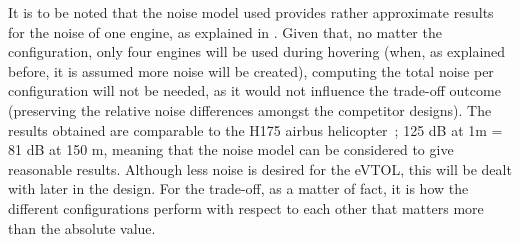 It is to be noted that the noise model used provides rather approximate results for the noise of one engine, as explained in .
Given that, no matter the configuration, only four engines will be used during hovering (when, as explained before, it is assumed more noise will be created), computing the total noise per configuration will not be needed, as it would not influence the trade-off outcome (preserving the relative noise differences amongst the competitor designs).
The results obtained are comparable to the H175 airbus helicopter~\cite{HeliAirbus}; 125 dB at 1m = 81 dB at 150 m, meaning that the noise model can be considered to give reasonable results.
Although less noise is desired for the eVTOL, this will be dealt with later in the design.
For the trade-off, as a matter of fact, it is how the different configurations perform with respect to each other that matters more than the absolute value.

